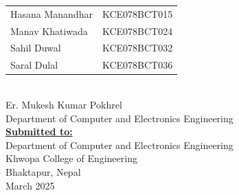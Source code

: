 \begin{center}
\begin{tabular}{p{3.5in} p{2in}}
        \hspace{0.3cm}Hasana Manandhar & KCE078BCT015\\
        \hspace{0.3cm}Manav Khatiwada & KCE078BCT024\\
        \hspace{0.3cm}Sahil Duwal & KCE078BCT032\\
        \hspace{0.3cm}Saral Dulal & KCE078BCT036\\
    \end{tabular}\\
    \vspace{1cm}
    {Er. Mukesh Kumar Pokhrel}\\
    {Department of Computer and Electronics Engineering}\\
    \large\textbf{\underline{Submitted to:}}\\
    \large Department of Computer and Electronics Engineering\\
    \large Khwopa College of Engineering\\
    \large Bhaktapur, Nepal\\[0.25cm]
    \large{March 2025}
	
    \end{center}
